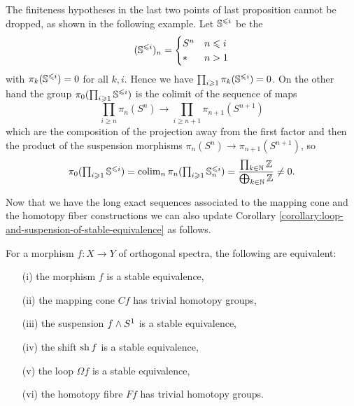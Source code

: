\begin{example}
The finiteness hypotheses in the last two points of last proposition cannot be dropped, as shown in the following example. Let $\mathbb{S}^{\leqslant i}$ be the 
\[
(\mathbb{S}^{\leqslant i})_n=\begin{cases}
S^n & n\leqslant i\\
* & n>1
\end{cases}
\]
with $\pi_k(\mathbb{S}^{\leqslant i})=0$ for all $k,i$.  Hence we have $\prod_{i\geqslant1}\pi_k(\mathbb{S}^{\leqslant i})=0$. On the other hand the group $\pi_0(\prod_{i\geqslant 1}\mathbb{S}^{\leqslant i})$ is the colimit of the sequence of maps
\[\prod_{i\geq n}\pi_n(S^n)\to\prod_{i\geq n+1}\pi_{n+1}(S^{n+1})\]
which are the composition of the projection away from the first factor and then the product of the suspension morphisms $\pi_n(S^n)\to\pi_{n+1}(S^{n+1})$, so
\[\textstyle\pi_0(\prod_{i\geqslant 1}\mathbb{S}^{\leqslant i}) = \operatorname*{colim}_n \pi_n(\prod_{i\geqslant1}\mathbb{S}^{\leqslant i}_n) = \displaystyle\frac{\prod_{k \in {\mathbb N}} {\mathbb Z}}{\bigoplus_{k \in {\mathbb N}} {\mathbb Z}} \neq 0. \]
\end{example}

Now that we have the long exact sequences associated to the mapping cone and the homotopy fiber constructions we can also update Corollary \ref{corollary:loop-and-suspension-of-stable-equivalence} as follows.

\begin{corollary}
For a morphism $f:X\to Y$ of orthogonal spectra, the following are equivalent:
\begin{itemize}
    \item[(i)] the morphism $f$ is a stable equivalence,
    \item[(ii)] the mapping cone $Cf$ has trivial homotopy groups,
    \item[(iii)] the suspension $f\wedge S^1$ is a stable equivalence,
    \item[(iv)] the shift $\operatorname{sh} f$ is a stable equivalence,
    \item[(v)] the loop $\Omega f$ is a stable equivalence,
    \item[(vi)] the homotopy fibre $Ff$ has trivial homotopy groups.
\end{itemize}
\end{corollary}
